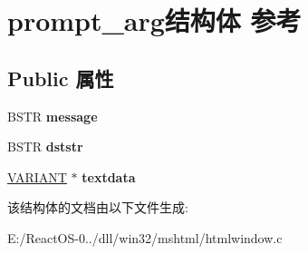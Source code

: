 \hypertarget{structprompt__arg}{}\section{prompt\+\_\+arg结构体 参考}
\label{structprompt__arg}
\subsection*{Public 属性}
\begin{DoxyCompactItemize}
\item 
\mbox{\label{structprompt__arg_ad168f8b127c9d1d46514d2ed0169bab1}} 
B\+S\+TR {\bfseries message}
\item 
\mbox{\label{structprompt__arg_a894fa52d49c89816fd41f212ba2f532d}} 
B\+S\+TR {\bfseries dststr}
\item 
\mbox{\label{structprompt__arg_ae9006fd9d1e488e02869d1c6b41b3056}} 
\hyperlink{structtag_v_a_r_i_a_n_t}{V\+A\+R\+I\+A\+NT} $\ast$ {\bfseries textdata}
\end{DoxyCompactItemize}


该结构体的文档由以下文件生成\+:\begin{DoxyCompactItemize}
\item 
E\+:/\+React\+O\+S-\/0../dll/win32/mshtml/htmlwindow.\+c\end{DoxyCompactItemize}

